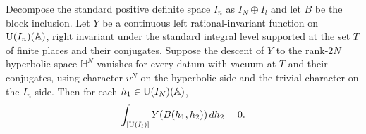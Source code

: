 \begin{lemma}
\label{lem:c-false-fourier-block-period}
\emitthmsource
Decompose the standard positive definite space $I_n$ as $I_N\oplus I_l$ and let $B$ be the block inclusion. Let $Y$ be a continuous left rational-invariant function on $\operatorname{U}(I_n)(\mathbb A)$, right invariant under the standard integral level supported at the set $T$ of finite places and their conjugates. Suppose the descent of $Y$ to the rank-$2N$ hyperbolic space $\mathbb H^N$ vanishes for every datum with vacuum at $T$ and their conjugates, using character $\upsilon^N$ on the hyperbolic side and the trivial character on the $I_n$ side. Then for each $h_1\in \operatorname{U}(I_N)(\mathbb A)$,
\[
       \int_{[\operatorname{U}(I_l)]}Y(B(h_1,h_2))\,dh_2=0 .
\]
\end{lemma}


